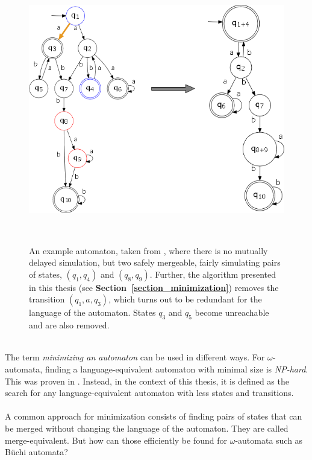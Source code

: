 \documentclass[12pt,oneside,bibliography=totoc,abstracton]{scrartcl}
\newcommand{\sectionref}[1]{\textbf{Section~\ref{#1}}}
\newcommand{\libref}[1]{\textbf{\cite{#1}}}
\begin{document}
\begin{figure}
	 \begin{center}
		\includegraphics[scale=0.8]{res/fair_nodelayed_edge}
	\end{center}
	\caption{An example automaton, taken from \libref{fair_minimization}, where there is no mutually delayed simulation,
		but two safely mergeable, fairly simulating pairs of states, $(q_1, q_4)$ and $(q_8, q_9)$.
		Further, the algorithm presented in this thesis (see \sectionref{section_minimization})
		removes the transition $(q_1, a, q_3)$, which turns out to be redundant for the language of the automaton.
		States $q_3$ and $q_5$ become unreachable and are also removed.}
	\label{fair_nodelayed2}\quad\\
\end{figure}\quad\\
The term \textit{minimizing an automaton} can be used in different ways. For $\omega$-automata, finding a
language-equivalent automaton with minimal size is \textit{NP-hard}. This was proven in \libref{nphard}.
Instead, in the context of this thesis, it is defined as the search for any language-equivalent
automaton with less states and transitions.\\\\
A common approach for minimization consists of finding pairs of states that can be merged without
changing the language of the automaton. They are called merge-equivalent. But how can those efficiently
be found for $\omega$-automata such as Büchi automata?
\end{document}
